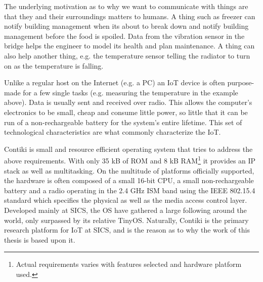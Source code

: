 \documentclass[final,a4paper,twoside,11pt,onecolumn]{report}
\begin{document}
The underlying motivation as to why we want to communicate with things are that they and their surroundings matters to humans. A thing such as freezer can notify building management when its about to break down and notify building management before the food is spoiled. Data from the vibration sensor in the bridge helps the engineer to model its health and plan maintenance. A thing can also help another thing, e.g. the temperature sensor telling the radiator to turn on as the temperature is falling.


Unlike a regular host on the Internet (e.g. a PC) an IoT device is often purpose-made for a few single tasks (e.g. measuring the temperature in the example above). Data is usually sent and received over radio. This allows the computer's electronics to be small, cheap and consume little power, so little that it can be run of a non-rechargeable battery for the system's entire lifetime. This set of technological characteristics are what commonly characterize the IoT.


Contiki is small and resource efficient operating system that tries to address the above requirements. With only 35 kB of ROM and 8 kB RAM\footnote{Actual requirements varies with features selected and hardware platform used.} it provides an IP stack as well as multitasking. On the multitude of platforms officially supported, the hardware is often composed of a small 16-bit CPU, a small non-rechargeable battery and a radio operating in the 2.4 GHz ISM band using the IEEE 802.15.4 standard which specifies the physical as well as the media access control layer. Developed mainly at SICS, the OS have gathered a large following around the world, only surpassed by its relative TinyOS. Naturally, Contiki is the primary research platform for IoT at SICS, and is the reason as to why the work of this thesis is based upon it.
\end{document}
